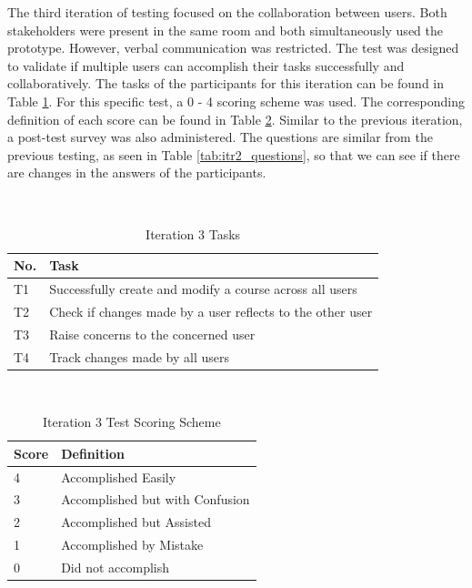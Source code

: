 The third iteration of testing focused on the collaboration between users. Both stakeholders were present in the same room and both simultaneously used the prototype. However, verbal communication was restricted. The test was designed to validate if multiple users can accomplish their tasks successfully and collaboratively. The tasks of the participants for this iteration can be found in Table \ref{tab:tasks3}. For this speciﬁc test, a 0 - 4 scoring scheme was used. The corresponding deﬁnition of each score can be found in Table \ref{tab:itr3_scoring_scheme}. Similar to the previous iteration, a post-test survey was also administered. The questions are similar from the previous testing, as seen in Table \ref{tab:itr2_questions}, so that we can see if there are changes in the answers of the participants. 

\begin{table}
  \centering
  \caption{Iteration 3 Tasks}~\label{tab:tasks3}
  \addtolength{\tabcolsep}{2pt} 
  \begin{tabular}{p{0.5cm}|p{6.5cm}}
  	\toprule
    \rule{0pt}{8pt}No. & Task \\[2pt]
    \toprule
    T1 & Successfully create and modify a course across all users \\
    T2 & Check if changes made by a user reflects to the other user \\
    T3 & Raise concerns to the concerned user \\
    T4 & Track changes made by all users \\
    \bottomrule
  \end{tabular}
  \addtolength{\tabcolsep}{-2pt} 
\end{table}

\begin{table}
  \centering
  \caption{Iteration 3 Test Scoring Scheme}~\label{tab:itr3_scoring_scheme}
  \addtolength{\tabcolsep}{2pt} 
  \begin{tabular}{p{1cm}|p{5cm}}
  	\toprule
    \rule{0pt}{8pt}Score & Definition\\[2pt]
    \toprule
    4 & Accomplished Easily \\
    3 & Accomplished but with Confusion \\
    2 & Accomplished but Assisted \\
    1 & Accomplished by Mistake \\
    0 & Did not accomplish \\
    \bottomrule
  \end{tabular}
  \addtolength{\tabcolsep}{-2pt} 
\end{table}

